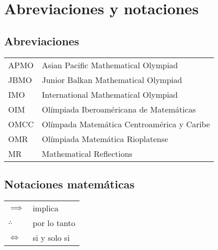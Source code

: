 \chapter*{\textbf{Abreviaciones y notaciones}}

\section*{Abreviaciones}

\begin{table}[H]
    \begin{tabular}{p{2cm} p{9cm}}
        APMO & Asian Pacific Mathematical Olympiad\\
        JBMO & Junior Balkan Mathematical Olympiad\\
        IMO  & International Mathematical Olympiad\\
        OIM  & Olímpiada Iberoaméricana de Matemáticas\\
        OMCC & Olímpada Matemática Centroamérica y Caribe\\
        OMR  & Olímpiada Matemática Rioplatense\\
        MR   & Mathematical Reflections
    \end{tabular}
\end{table}


\section*{Notaciones matemáticas}

\begin{table}[H]
    \begin{tabular}{p{2cm} p{9cm}}
        $\implies$ & implica\\
        $\therefore$ & por lo tanto\\
        $\iff$ & si y solo si
    \end{tabular}
\end{table}
